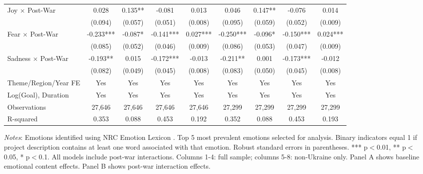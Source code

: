 \begin{table}[htbp]
\begin{threeparttable}
\begin{tabular}{lcccccccc}
Joy $\times$ Post-War & 0.028 & 0.135** & -0.081 & 0.013 & 0.046 & 0.147** & -0.076 & 0.014 \\
& (0.094) & (0.057) & (0.051) & (0.008) & (0.095) & (0.059) & (0.052) & (0.009) \\
Fear $\times$ Post-War & -0.233*** & -0.087* & -0.141*** & 0.027*** & -0.250*** & -0.096* & -0.150*** & 0.024*** \\
& (0.085) & (0.052) & (0.046) & (0.009) & (0.086) & (0.053) & (0.047) & (0.009) \\
Sadness $\times$ Post-War & -0.193** & 0.015 & -0.172*** & -0.013 & -0.211** & 0.001 & -0.173*** & -0.012 \\
& (0.082) & (0.049) & (0.045) & (0.008) & (0.083) & (0.050) & (0.045) & (0.008) \\
\midrule
Theme/Region/Year FE & Yes & Yes & Yes & Yes & Yes & Yes & Yes & Yes \\
Log(Goal), Duration & Yes & Yes & Yes & Yes & Yes & Yes & Yes & Yes \\
\midrule
Observations & 27,646 & 27,646 & 27,646 & 27,646 & 27,299 & 27,299 & 27,299 & 27,299 \\
R-squared & 0.353 & 0.088 & 0.453 & 0.192 & 0.352 & 0.088 & 0.453 & 0.193 \\
\bottomrule
\end{tabular}
\begin{tablenotes}
\small
\item \textit{Notes}: Emotions identified using NRC Emotion Lexicon \citep{mohammad2013}. Top 5 most prevalent emotions selected for analysis. Binary indicators equal 1 if project description contains at least one word associated with that emotion. Robust standard errors in parentheses. *** p$<$0.01, ** p$<$0.05, * p$<$0.1. All models include post-war interactions. Columns 1-4: full sample; columns 5-8: non-Ukraine only. Panel A shows baseline emotional content effects. Panel B shows post-war interaction effects.
\end{tablenotes}
\end{threeparttable}
\end{table}

